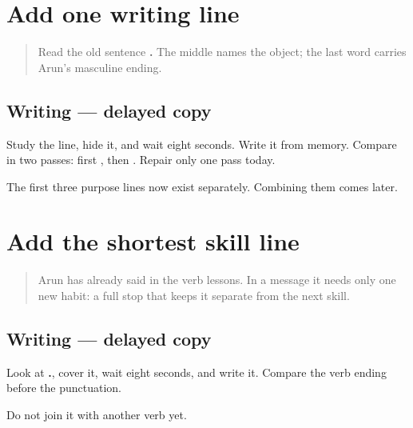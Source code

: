 \section[mī mājhaṁ nāv lihito]{Add one writing line}

\label{lesson:MR-A1M06-writing-line}



\begin{quote}
Read the old sentence \textbf{   .} The middle names the object; the last word carries Arun's masculine ending.
\end{quote}

\subsection*{Writing — delayed copy}
Study the line, hide it, and wait eight seconds. Write it from memory. Compare in two passes: first \textbf{ }, then \textbf{}. Repair only one pass today.

\begin{tcolorbox}[breakable,colback=teal!4,colframe=teal!35!black,title={Before you move on}]
The first three purpose lines now exist separately. Combining them comes later.
\end{tcolorbox}
\section[mī bolto]{Add the shortest skill line}

\label{lesson:MR-A1M07-speaking-line}



\begin{quote}
Arun has already said \textbf{ } in the verb lessons. In a message it needs only one new habit: a full stop that keeps it separate from the next skill.
\end{quote}

\subsection*{Writing — delayed copy}
Look at \textbf{ .}, cover it, wait eight seconds, and write it. Compare the verb ending before the punctuation.

\begin{tcolorbox}[breakable,colback=teal!4,colframe=teal!35!black,title={Before you move on}]
Do not join it with another verb yet.
\end{tcolorbox}
